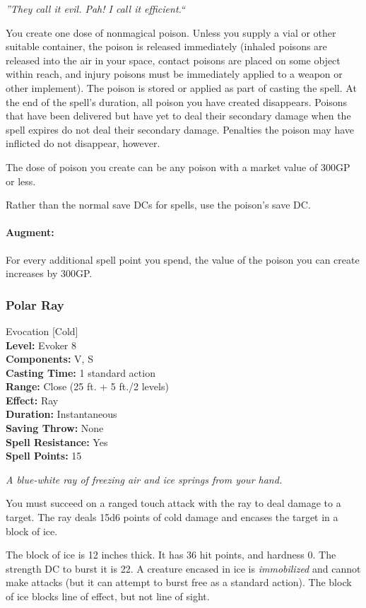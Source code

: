 \emph{''They call it evil. Pah! I call it efficient.``}

You create one dose of nonmagical poison. 
Unless you supply a vial or other suitable container, the poison is released immediately (inhaled poisons are released into the air in your space, contact poisons are placed on some object within reach,  and injury poisons must be immediately applied to a weapon or other implement). 
The poison is stored or applied as part of casting the spell.
At the end of the spell's duration, all poison you have created disappears.
Poisons that have been delivered but have yet to deal their secondary damage when the spell expires do not deal their secondary damage.
Penalties the poison may have inflicted do not disappear, however.

The dose of poison you create can be any poison with a market value of 300GP or less.

Rather than the normal save DCs for spells, use the poison's save DC.

\paragraph{Augment:} For every additional spell point you spend, the value of the poison you can create increases by 300GP.
\subsubsection{Polar Ray}
\label{Spell:PolarRay}
Evocation [Cold]
\\ \textbf{Level:} Evoker 8
\\ \textbf{Components:} V, S
\\ \textbf{Casting Time:} 1 standard action
\\ \textbf{Range:} Close (25 ft. + 5 ft./2 levels)
\\ \textbf{Effect:} Ray
\\ \textbf{Duration:} Instantaneous
\\ \textbf{Saving Throw:} None
\\ \textbf{Spell Resistance:} Yes
\\ \textbf{Spell Points:} 15

\emph{A blue-white ray of freezing air and ice springs from your hand.}

You must succeed on a ranged touch attack with the ray to deal damage to a target. 
The ray deals 15d6 points of cold damage and encases the target in a block of ice.

The block of ice is 12 inches thick. It has 36 hit points, and hardness 0. The strength DC to burst it is 22.
A creature encased in ice is \emph{immobilized} and cannot make attacks (but it can attempt to burst free as a standard action). 
The block of ice blocks line of effect, but not line of sight.

